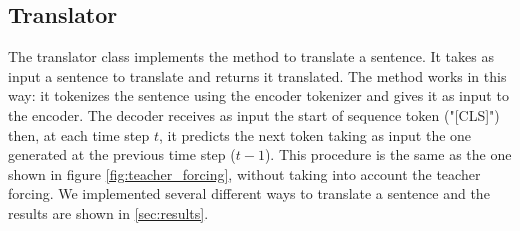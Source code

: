 \subsection{Translator}
The translator class implements the method to translate a sentence. It takes as input a sentence to translate and returns it translated. The method works in this way: it tokenizes the sentence using the encoder tokenizer and gives it as input to the encoder. The decoder receives as input the start of sequence token ("[CLS]") then, at each time step $t$, it predicts the next token taking as input the one generated at the previous time step ($t-1$). This procedure is the same as the one shown in figure \ref{fig:teacher_forcing}, without taking into account the teacher forcing. We implemented several different ways to translate a sentence and the results are shown in \autoref{sec:results}.

